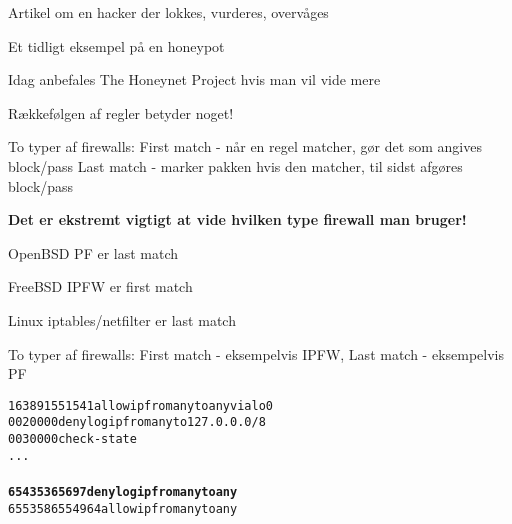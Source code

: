 \documentclass[Screen16to9,17pt]{foils}
\begin{document}


\begin{list1}
\item Artikel om en hacker der lokkes, vurderes, overvåges
\item Et tidligt eksempel på en honeypot
\item Idag anbefales The Honeynet Project hvis man vil vide mere
\\
\end{list1}











\begin{list1}
\item Rækkefølgen af regler betyder noget!
\begin{list2}
\item To typer af firewalls:
 First match - når en regel matcher, gør det som angives block/pass
 Last match  - marker pakken hvis den matcher, til sidst afgøres block/pass
\end{list2}
\item {\bf Det er ekstremt vigtigt at vide hvilken type firewall
    man bruger!}
\item OpenBSD PF er last match
\item FreeBSD IPFW er first match
\item Linux iptables/netfilter er last match
\end{list1}


\begin{list2}
\item To typer af firewalls:
 First match - eksempelvis IPFW,
 Last match - eksempelvis PF
\end{list2}



\begin{alltt}
 16389  1551541 allow ip from any to any via lo0
00200     0        0 deny log ip from any to 127.0.0.0/8
00300     0        0 check-state
...
{\bfseries
65435    36     5697 deny log ip from any to any}
65535   865    54964 allow ip from any to any
\end{alltt}
\end{document}
